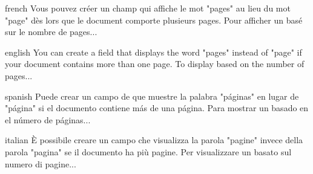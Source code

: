 \documentclass{article}
\begin{document}
\begin{conditext}{french}
Vous pouvez créer un champ \tcml{} qui affiche le mot "pages" au
lieu du mot "page" dès lors que le document comporte plusieurs pages.
Pour afficher un \tcml{} basé sur le nombre de pages...
\end{conditext}

\begin{conditext}{english}
You can create a \tcml{} field that displays the word "pages" instead
of "page" if your document contains more than one page. To display
\tcml{} based on the number of pages...
\end{conditext}

\begin{conditext}{spanish}
Puede crear un campo de \tcml{} que muestre la palabra "páginas"
en lugar de "página" si el documento contiene más de una página.
Para mostrar un \tcml{} basado en el número de páginas...
\end{conditext}

\begin{conditext}{italian}
È possibile creare un campo \tcml{} che visualizza la parola "pagine"
invece della parola "pagina" se il documento ha più pagine. Per visualizzare
un \tcml{} basato sul numero di pagine...
\end{conditext}
\end{document}

